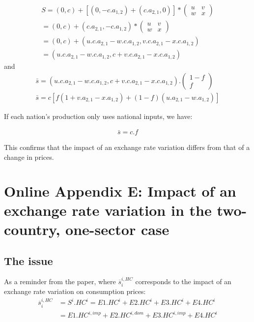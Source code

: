 \documentclass[12pt,a4paper]{article}
\begin{document}
\begin{gather*}
S =\left(0,c\right)+\left[\left(0,-c.a_{1,2}\right)+\left(c.a_{2,1},0\right)\right]*\left(\begin{matrix}u&v\\w&x\end{matrix}\right)
\\
=\left(0,c\right)+\left(c.a_{2,1},-c.a_{1,2}\right)*\left(\begin{matrix}u&v\\w&x\end{matrix}\right)
\\
=\left(0,c\right)+\left(u.c.a_{2,1}-w.c.a_{1,2},v.c.a_{2,1}-x.c.a_{1,2}\right)
\\
=\left(u.c.a_{2,1}-w.c.a_{1,2},c+v.c.a_{2,1}-x.c.a_{1,2}\right)
\end{gather*}
and
\begin{gather*}
\bar{s}=\left(u.c.a_{2,1}-w.c.a_{1,2},c+v.c.a_{2,1}-x.c.a_{1,2}\right).\left(\begin{matrix}1-f\\f\end{matrix}\right)
\\
\bar{s}=c\left[f\left(1+v.a_{2,1}-x.a_{1,2}\right)+\left(1-f\right)\left(u.a_{2,1}-w.a_{1,2}\right)\right]
\end{gather*}


If each nation's production only uses national inputs, we have:

\begin{gather*}
\bar{s}=c.f
\end{gather*}

This confirms that the impact of an exchange rate variation differs from that of a change in prices.


\newpage
\section*{Online Appendix E: Impact of an exchange rate variation in the two-country, one-sector case}\label{AnalyticalAppendix}
\subsection*{The issue}

As a reminder from the paper, where $\overline{s}_{i}^{i,HC}$ corresponds to the impact of an exchange rate variation on consumption prices:  
\begin{equation}
\begin{array}{lccl}
\overline{s}_{i}^{i,HC}&=S^i.HC^i=E1.HC^i+E2.HC^i+E3.HC^i+E4.HC^i \\
&=E1.HC^{i,imp}+E2.HC^{i,dom}+E3.HC^{i,imp}+E4.HC^i
\end{array} 
\end{equation}
\end{document}
